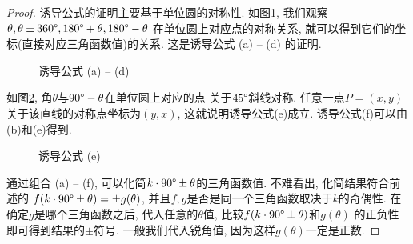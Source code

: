 \begin{proof}
  诱导公式的证明主要基于单位圆的对称性.
  如图\ref{fig:induction-1},
  我们观察$\theta,\theta\pm360\degree,
    180\degree+\theta,180\degree-\theta$
  在单位圆上对应点的对称关系,
  就可以得到它们的坐标(直接对应三角函数值)的关系.
  这是诱导公式 (a) -- (d) 的证明.

  \begin{figure}
    \centering
    \caption{诱导公式 (a) -- (d)}
    \label{fig:induction-1}
  \end{figure}

  如图\ref{fig:induction-2},
  角$\theta$与$90\degree-\theta$在单位圆上对应的点
  关于$45\degree$斜线对称.
  任意一点$P=(x,y)$关于该直线的对称点坐标为$(y,x)$,
  这就说明诱导公式(e)成立.
  诱导公式(f)可以由(b)和(e)得到.

  \begin{figure}
    \centering
    \caption{诱导公式 (e)}
    \label{fig:induction-2}
  \end{figure}

  通过组合 (a) -- (f), 可以化简$k\cdot90\degree\pm\theta$的三角函数值.
  不难看出, 化简结果符合前述的
  $f(k\cdot90\degree\pm\theta) = \pm g(\theta)$,
  并且$f,g$是否是同一个三角函数取决于$k$的奇偶性.
  在确定$g$是哪个三角函数之后, 代入任意的$\theta$值,
  比较$f(k\cdot90\degree\pm\theta)$和$g(\theta)$
  的正负性即可得到结果的$\pm$符号.
  一般我们代入锐角值, 因为这样$g(\theta)$一定是正数.
\end{proof}

